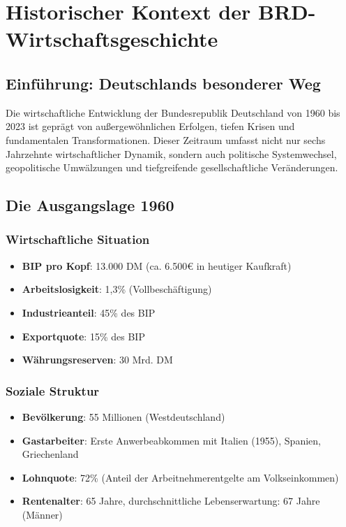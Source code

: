 \chapter{Historischer Kontext der BRD-Wirtschaftsgeschichte}

\section{Einführung: Deutschlands besonderer Weg}

Die wirtschaftliche Entwicklung der Bundesrepublik Deutschland von 1960 bis 2023 ist geprägt von außergewöhnlichen Erfolgen, tiefen Krisen und fundamentalen Transformationen. Dieser Zeitraum umfasst nicht nur sechs Jahrzehnte wirtschaftlicher Dynamik, sondern auch politische Systemwechsel, geopolitische Umwälzungen und tiefgreifende gesellschaftliche Veränderungen.

\section{Die Ausgangslage 1960}

\subsection{Wirtschaftliche Situation}
\begin{itemize}
\item \textbf{BIP pro Kopf}: 13.000 DM (ca. 6.500€ in heutiger Kaufkraft)
\item \textbf{Arbeitslosigkeit}: 1,3\% (Vollbeschäftigung)
\item \textbf{Industrieanteil}: 45\% des BIP
\item \textbf{Exportquote}: 15\% des BIP
\item \textbf{Währungsreserven}: 30 Mrd. DM
\end{itemize}

\subsection{Soziale Struktur}
\begin{itemize}
\item \textbf{Bevölkerung}: 55 Millionen (Westdeutschland)
\item \textbf{Gastarbeiter}: Erste Anwerbeabkommen mit Italien (1955), Spanien, Griechenland
\item \textbf{Lohnquote}: 72\% (Anteil der Arbeitnehmerentgelte am Volkseinkommen)
\item \textbf{Rentenalter}: 65 Jahre, durchschnittliche Lebenserwartung: 67 Jahre (Männer)
\end{itemize}

